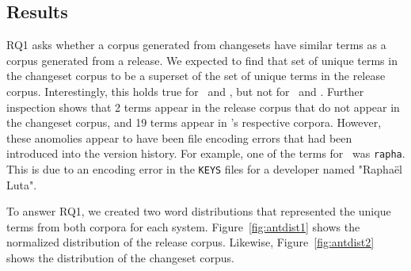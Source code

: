 \subsection{Results}

RQ1 asks whether a corpus generated from changesets have similar terms
as a corpus generated from a release.
We expected to find that set of unique terms in the changeset corpus to be
a superset of the set of unique terms in the release corpus.
Interestingly, this holds true for \jodatime\ and \aspectj,
but not for \ant\ and \postgres.
Further inspection shows that 2 terms appear in the \ant release corpus that do not appear in the changeset corpus,
and 19 terms appear in \postgres's respective corpora.
However, these anomolies appear to have been file encoding errors that
had been introduced into the version history.
For example, one of the terms for \ant\ was \texttt{rapha}. This is due
to an encoding error in the \texttt{KEYS} files for a developer named
"Rapha\"{e}l Luta".

To answer RQ1, we created two word distributions that represented the unique
terms from both corpora for each system.
Figure~\ref{fig:antdist1} shows the normalized distribution of the \ant release corpus.
Likewise, Figure~\ref{fig:antdist2} shows the distribution of the \ant changeset corpus.
%
%

